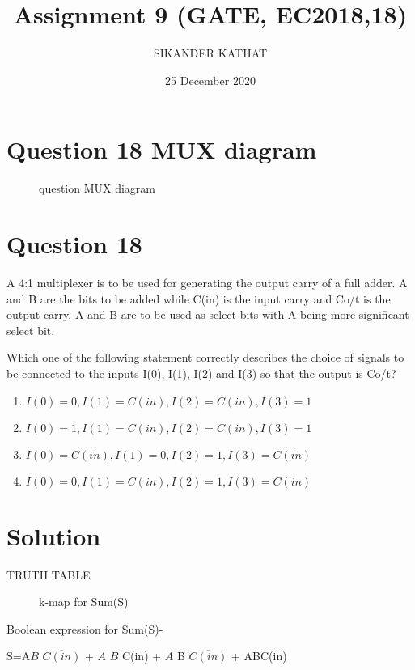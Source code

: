 \documentclass{article}
\title{Assignment 9 (GATE, EC2018,18)}
\author{SIKANDER KATHAT }
\date{25 December 2020}
\begin{document}
\maketitle

\section{ Question  18 MUX diagram }
\begin{figure}[!ht]
\centering
{

}
\caption{question MUX diagram}
\label{MUX diagram)}
\end{figure}

\section{Question 18}
A 4:1 multiplexer is to be used for generating the output carry of a full adder. A and B are the bits to be added while C(in) is the input carry and Co/t is the output carry. A and B are to be used as select bits with A being more significant select bit.

Which one of the following statement correctly describes the choice of signals to be connected to the inputs I(0), I(1), I(2) and I(3) so that the output is Co/t?

\begin{enumerate}
    \item$I(0)=0,I(1)=C(in),I(2)=C(in),I(3)=1$
    \item$I(0)=1,I(1)=C(in),I(2)=C(in),I(3)=1$
    \item$I(0)=C(in),I(1)=0,I(2)=1,I(3)=C(in)$
    \item$I(0)=0,I(1)=C(in),I(2)=1,I(3)=C(in)$
\end{enumerate}

\section{Solution}
\begin{table}[!ht]
{

}
\caption{TRUTH TABLE}
\label{table}
\end{table}


\begin{figure}[!ht]
\centering
{

}
\caption{k-map for Sum(S)}
\label{kmap Sum(S)}
\end{figure}


    
    Boolean expression for Sum(S)-
    
    S=A$\overline{B}$ $\overline{C(in)}$ + $\overline{A}$ $\overline{B}$ C(in) + $\overline{A}$ B $\overline{C(in)}$ + ABC(in)
\newpage
\end{document}
